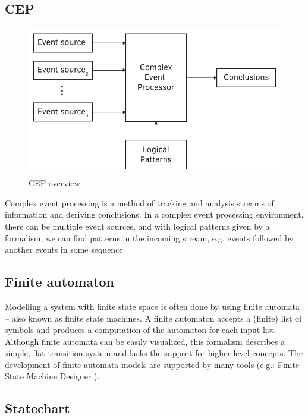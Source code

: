 \subsection{CEP}

\begin{figure}[h]
	\centering
	\includegraphics[width=0.7\linewidth]{include/figures/chapter_1/CEP}
	\caption{CEP overview}
	\label{fig:intro:vmodel}
\end{figure}

Complex event processing is a method of tracking and analysis streams of information and deriving conclusions. In a complex event processing environment, there can be multiple event sources, and with logical patterns given by a formalism, we can find patterns in the incoming stream, e.g. events followed by another events in some sequence: \citep{epbas}

\subsection{Finite automaton}

Modelling a system with finite state space is often done by using finite automata -- also known as finite state machines. A finite automaton accepts a (finite) list of symbols and produces a computation of the automaton for each input list.
Although finite automata can be easily visualized, this formalism describes a simple, flat transition system and lacks the support for higher level concepts. The development of finite automata models  are supported by many tools (e.g.: Finite State Machine Designer \citep{yakindu}).

\subsection{Statechart}

